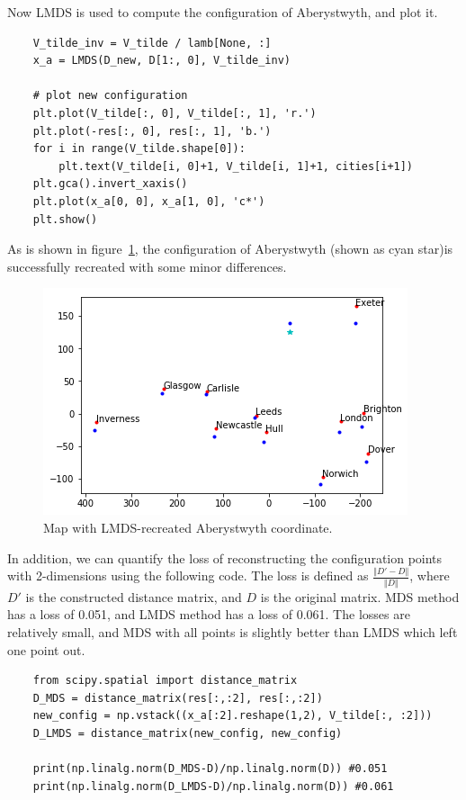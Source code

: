 \documentclass{article}
\begin{document}
Now LMDS is used to compute the configuration of Aberystwyth, and plot it. 
\begin{lstlisting}
	V_tilde_inv = V_tilde / lamb[None, :]
	x_a = LMDS(D_new, D[1:, 0], V_tilde_inv)

	# plot new configuration
	plt.plot(V_tilde[:, 0], V_tilde[:, 1], 'r.')
	plt.plot(-res[:, 0], res[:, 1], 'b.')
	for i in range(V_tilde.shape[0]):
		plt.text(V_tilde[i, 0]+1, V_tilde[i, 1]+1, cities[i+1])
	plt.gca().invert_xaxis()
	plt.plot(x_a[0, 0], x_a[1, 0], 'c*')
	plt.show()
\end{lstlisting}
As is shown in figure~\ref{fig:final}, the configuration of Aberystwyth (shown as cyan star)is successfully recreated with some minor differences. 

\begin{figure}[h!]
\centering
\includegraphics[width=0.6\linewidth]{../images/4.png}
\caption{Map with LMDS-recreated Aberystwyth coordinate.}
\label{fig:final}
\end{figure}
In addition, we can quantify the loss of reconstructing the configuration points with 2-dimensions using the following code. The loss is defined as $\frac{\Vert D' - D\Vert}{\Vert D \Vert}$, where $D'$ is the constructed distance matrix, and $D$ is the original matrix. MDS method has a loss of 0.051, and LMDS method has a loss of 0.061. The losses are relatively small, and MDS with all points is slightly better than LMDS which left one point out.
\begin{lstlisting}
	from scipy.spatial import distance_matrix
	D_MDS = distance_matrix(res[:,:2], res[:,:2])
	new_config = np.vstack((x_a[:2].reshape(1,2), V_tilde[:, :2]))
	D_LMDS = distance_matrix(new_config, new_config)

	print(np.linalg.norm(D_MDS-D)/np.linalg.norm(D)) #0.051
	print(np.linalg.norm(D_LMDS-D)/np.linalg.norm(D)) #0.061
\end{lstlisting}
\end{document}

